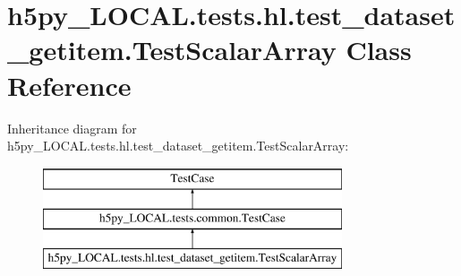 \hypertarget{classh5py__LOCAL_1_1tests_1_1hl_1_1test__dataset__getitem_1_1TestScalarArray}{}\section{h5py\+\_\+\+L\+O\+C\+A\+L.\+tests.\+hl.\+test\+\_\+dataset\+\_\+getitem.\+Test\+Scalar\+Array Class Reference}
\label{classh5py__LOCAL_1_1tests_1_1hl_1_1test__dataset__getitem_1_1TestScalarArray}
Inheritance diagram for h5py\+\_\+\+L\+O\+C\+A\+L.\+tests.\+hl.\+test\+\_\+dataset\+\_\+getitem.\+Test\+Scalar\+Array\+:\begin{figure}[H]
\begin{center}
\leavevmode
\includegraphics[height=3.000000cm]{classh5py__LOCAL_1_1tests_1_1hl_1_1test__dataset__getitem_1_1TestScalarArray}
\end{center}
\end{figure}
